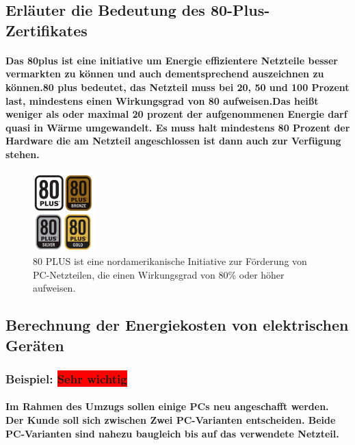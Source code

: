 \documentclass[a4paper]{article}
\begin{document}
    \subsection{\color{red}Erläuter die Bedeutung des 80-Plus-Zertifikates}\label{subsec:erläuter-die-bedeutung-des-80-plus-zertifikates}
        \paragraph{\color{codegreen} Das 80plus  ist eine initiative um Energie effizientere Netzteile besser vermarkten zu können und auch dementsprechend auszeichnen zu können.\color{blue}80 plus bedeutet, das Netzteil muss bei 20, 50
        und 100 Prozent last, mindestens einen Wirkungsgrad von 80 aufweisen.\color{codegreen}Das heißt weniger als oder maximal 20 prozent der aufgenommenen Energie darf quasi in Wärme umgewandelt. Es muss halt mindestens 80 Prozent der Hardware die am Netzteil angeschlossen ist dann auch zur Verfügung stehen.}
    \begin{center}
        \begin{figure}[H]
            \centering
            \includegraphics[height=3cm]{media/80plus}
            \captionsetup{labelformat=empty}
            \caption{\color{orange} 80 PLUS ist eine nordamerikanische Initiative zur Förderung von PC-Netzteilen, die einen Wirkungsgrad von 80\% oder höher aufweisen. }
            \label{fig:80plus}
        \end{figure}
    \end{center}
    \subsection{\color{red}Berechnung der Energiekosten von elektrischen Geräten}\label{subsec:berechnung-der-energiekosten-von-elektrischen-geräten}
        \subsubsection{Beispiel: \color{white}\colorbox{red}{Sehr wichtig}}
            \paragraph{\color{codegreen} Im Rahmen des Umzugs sollen einige PCs neu angeschafft werden. Der Kunde soll sich zwischen Zwei PC-Varianten entscheiden. Beide PC-Varianten sind nahezu baugleich bis auf das verwendete Netzteil.}
\end{document}
